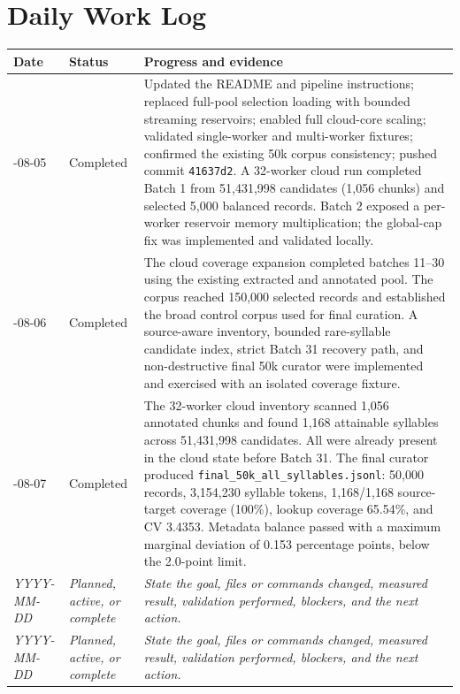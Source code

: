 \documentclass[11pt,a4paper]{article}
\begin{document}
\section{Daily Work Log}
\begin{longtable}{>{\raggedright\arraybackslash}p{}>{\raggedright\arraybackslash}p{}>{\raggedright\arraybackslash}p{}}
\toprule
\textbf{Date} & \textbf{Status} & \textbf{Progress and evidence} \\
\midrule
\endhead
2026-08-05 & Completed & Updated the README and pipeline instructions; replaced full-pool selection loading with bounded streaming reservoirs; enabled full cloud-core scaling; validated single-worker and multi-worker fixtures; confirmed the existing 50k corpus consistency; pushed commit \texttt{41637d2}. A 32-worker cloud run completed Batch 1 from 51,431,998 candidates (1,056 chunks) and selected 5,000 balanced records. Batch 2 exposed a per-worker reservoir memory multiplication; the global-cap fix was implemented and validated locally. \\
\addlinespace
2026-08-06 & Completed & The cloud coverage expansion completed batches 11--30 using the existing extracted and annotated pool. The corpus reached 150,000 selected records and established the broad control corpus used for final curation. A source-aware inventory, bounded rare-syllable candidate index, strict Batch 31 recovery path, and non-destructive final 50k curator were implemented and exercised with an isolated coverage fixture. \\
\addlinespace
2026-08-07 & Completed & The 32-worker cloud inventory scanned 1,056 annotated chunks and found 1,168 attainable syllables across 51,431,998 candidates. All were already present in the cloud state before Batch 31. The final curator produced \texttt{final\_50k\_all\_syllables.jsonl}: 50,000 records, 3,154,230 syllable tokens, 1,168/1,168 source-target coverage (100\%), lookup coverage 65.54\%, and CV 3.4353. Metadata balance passed with a maximum marginal deviation of 0.153 percentage points, below the 2.0-point limit. \\
\addlinespace
\rule{0pt}{3.6em}\textit{YYYY-MM-DD} & \textit{Planned, active, or complete} & \textit{State the goal, files or commands changed, measured result, validation performed, blockers, and the next action.} \\
\addlinespace
\rule{0pt}{3.6em}\textit{YYYY-MM-DD} & \textit{Planned, active, or complete} & \textit{State the goal, files or commands changed, measured result, validation performed, blockers, and the next action.} \\
\bottomrule
\end{longtable}
\end{document}
